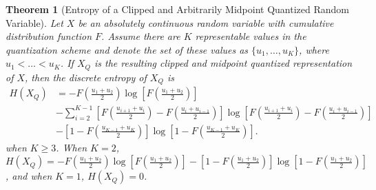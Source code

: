 \documentclass[12pt,onecolumn, margin=1in]{IEEEtran}
\newtheorem{theorem}{Theorem}[section]
\newcommand{\bracket}[1]{\left[ #1 \right]}
\newcommand{\paren}[1]{\left( #1 \right)}
\begin{document}
\begin{theorem}[Entropy of a Clipped and Arbitrarily Midpoint Quantized Random Variable]\label{thm:quantized_ent}
Let $X$ be an absolutely continuous random variable with cumulative distribution function $F$. Assume there are $K$ representable values in the quantization scheme and denote the set of these values as $\{u_1, \dots, u_K\}$, where $u_1 < \dots < u_K$. If $X_Q$ is the resulting clipped and midpoint quantized representation of $X$, then the discrete entropy of $X_Q$ is
\begin{equation*}
    \begin{aligned}
        H(X_Q) &= -F\paren{\frac{u_1 + u_2}{2}}\log\bracket{F\paren{\frac{u_1 + u_2}{2}}}\\
        &- \sum_{i = 2}^{K-1}\bracket{F\paren{\frac{u_{i+1} + u_i}{2}} - F\paren{\frac{u_{i} + u_{i-1}}{2}}}\log\bracket{F\paren{\frac{u_{i+1} + u_i}{2}} - F\paren{\frac{u_{i} + u_{i-1}}{2}}}\\
        &-\bracket{1 - F\paren{\frac{u_{K-1} + u_K}{2}}}\log\bracket{1 - F\paren{\frac{u_{K-1} + u_K}{2}}}.
        \end{aligned}
\end{equation*}
when $K \geq 3$. When $K = 2$, $H(X_Q) = -F\paren{\frac{u_1 + u_2}{2}}\log\bracket{F\paren{\frac{u_1 + u_2}{2}}} - \bracket{1 -  F\paren{\frac{u_1 + u_2}{2}}}\log\bracket{1 -  F\paren{\frac{u_1 + u_2}{2}}}$, and when $K = 1$, $H(X_Q) = 0$.


\end{theorem}
\end{document}
